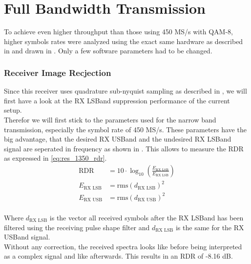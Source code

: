 \chapter{Full Bandwidth Transmission}
\label{chap:res_1350}

To achieve even higher throughput than those using 450 MS/s with \gls{QAM}-8,
higher symbols rates were analyzed using the exact same hardware as described
in  and drawn in . Only a
few software parameters had to be changed. \\

\subsection{Receiver Image Recjection}
Since this receiver uses quadrature sub-nyquist sampling as described in
, we will first have a look at the \gls{RX} \gls{LSBand}
suppression performance of the current setup. \\

Therefor we will first stick to the parameters used for the narrow band
transmission, especially the symbol rate of 450 MS/s. These parameters have the
big advantage, that the desired \gls{RX} \gls{USBand} and the undesired
\gls{RX} \gls{LSBand} signal are seperated in frequency as shown in
. This allows to measure the \gls{RDR}
as expressed in \eqref{eq:res_1350_rdr}. \\

\begin{align}
  \text{RDR} &= 10 \cdot \log_{10}\left(
  \frac{E_{\text{RX LSB}}}{E_{\text{RX LSB}}}
  \right) \\
  E_{\text{RX LSB}} &= \text{rms}(d_{\text{RX LSB}})^2 \\
  E_{\text{RX USB}} &= \text{rms}(d_{\text{RX USB}})^2 \\
  \label{eq:res_1350_rdr}
\end{align}

Where $d_{\text{RX LSB}}$ is the vector all received symbols after
the \gls{RX} \gls{LSBand} has been filtered using the receiving pulse shape
filter and $d_{\text{RX LSB}}$ is the same for the \gls{RX} \gls{USBand} signal. \\

Without any correction, the received spectra looks like
 before being interpreted as a complex
signal and like  afterwards.
This results in an \gls{RDR} of -8.16 dB. \\

